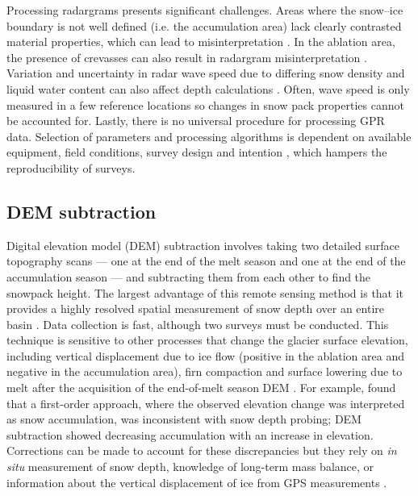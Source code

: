 \documentclass{sfuthesis}
\begin{document}
{\begin{appendices}
Processing radargrams presents significant challenges. Areas where the snow--ice boundary is not well defined (i.e. the accumulation area) lack clearly contrasted material properties, which can lead to misinterpretation \citep{McGrath2015}. In the ablation area, the presence of crevasses can also result in radargram misinterpretation \citep{Machguth2006}. Variation and uncertainty in radar wave speed due to differing snow density and liquid water content can also affect depth calculations \citep{Sold2013}. Often, wave speed is only measured in a few reference locations so changes in snow pack properties cannot be accounted for. Lastly, there is no universal procedure for processing GPR data. Selection of parameters and processing algorithms is dependent on available equipment, field conditions, survey design and intention \citep{Sold2013}, which hampers the reproducibility of surveys.

\subsection{DEM subtraction}

Digital elevation model (DEM) subtraction involves taking two detailed surface topography scans --- one at the end of the melt season and one at the end of the accumulation season --- and subtracting them from each other to find the snowpack height. The largest advantage of this remote sensing method is that it provides a highly resolved spatial measurement of snow depth over an entire basin \citep{Deems2006, Sold2013}. Data collection is fast, although two surveys must be conducted. This technique is sensitive to other processes that change the glacier surface elevation, including vertical displacement due to ice flow (positive in the ablation area and negative in the accumulation area), firn compaction and surface lowering due to melt after the acquisition of the end-of-melt season DEM \citep{Sold2013}. For example, \cite{Sold2013} found that a first-order approach, where the observed elevation change was interpreted as snow accumulation, was inconsistent with snow depth probing; DEM subtraction showed decreasing accumulation with an increase in elevation. Corrections can be made to account for these discrepancies but they rely on \textit{in situ} measurement of snow depth, knowledge of long-term mass balance, or information about the vertical displacement of ice from GPS measurements \citep{Sold2013}. 


\end{appendices}}
\end{document}
